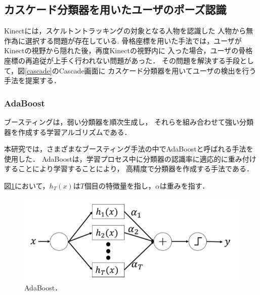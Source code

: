 \vspace{1.5cm}


\clearpage

\subsection{カスケード分類器を用いたユーザのポーズ認識}
Kinectには，スケルトントラッキングの対象となる人物を認識した
人物から無作為に選択する問題が存在している\cite{hitogomi}.
骨格座標を用いた手法では，ユーザがKinectの視野から隠れた後，再度Kinectの視野内に
入った場合，ユーザの骨格座標の再追従が上手く行われない問題があった\cite{beppu}．
その問題を解決する手段として，図\ref{cascade}のCascade画面に
カスケード分類器を用いてユーザの検出を行う手法を提案する．




\subsubsection{AdaBoost}
ブースティングは，弱い分類器を順次生成し，
それらを組み合わせて強い分類器を作成する学習アルゴリズムである\cite{boosting}．

本研究では，さまざまなブースティング手法の中でAdaBoostと呼ばれる手法を使用した．
AdaBoostは，学習プロセス中に分類器の認識率に適応的に重み付けすることにより学習することにより，
高精度で分類器を作成する手法である\cite{adaboost}．

図\ref{adaboost}において，$h_T(x)$は$T$個目の特徴量を指し，$\alpha$は重みを指す．

\vspace{1.2cm}


\begin{figure}[h]
    \centering
    \includegraphics[width=12cm]{image/adaboost.png}
    \caption[AdaBoost]{AdaBoost\cite{adafig}．}
  \label{adaboost}
\end{figure}

\vspace{1.2cm}

